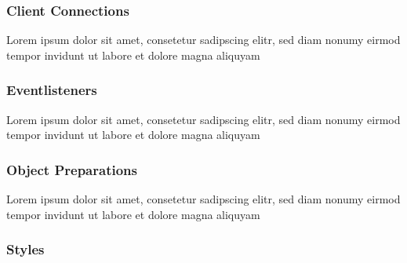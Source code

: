 \documentclass[a4paper]{spie}  %
\begin{document}
\subsubsection{Client Connections}
Lorem ipsum dolor sit amet, consetetur sadipscing elitr, sed diam nonumy eirmod tempor invidunt ut labore et dolore magna aliquyam
\subsubsection{Eventlisteners}
Lorem ipsum dolor sit amet, consetetur sadipscing elitr, sed diam nonumy eirmod tempor invidunt ut labore et dolore magna aliquyam
\subsubsection{Object Preparations}
Lorem ipsum dolor sit amet, consetetur sadipscing elitr, sed diam nonumy eirmod tempor invidunt ut labore et dolore magna aliquyam
\subsubsection{Styles}
\end{document}
